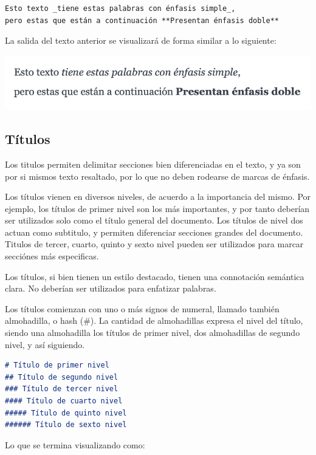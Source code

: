 \begin{lstlisting}[language=Markdown]
Esto texto _tiene estas palabras con énfasis simple_,
pero estas que están a continuación **Presentan énfasis doble**
\end{lstlisting}

La salida del texto anterior se visualizará de forma similar
a lo siguiente:

\includegraphics[]{apendices/markdown/imagenes/md_enfasis.png}

\subsection*{Títulos}

Los titulos permiten delimitar secciones bien diferenciadas en el texto,
y ya son por si mismos texto resaltado, por lo que no deben rodearse de
marcas de énfasis.

Los títulos vienen en diversos niveles, de acuerdo a la importancia del
mismo. Por ejemplo, los títulos de primer nivel son los más importantes,
y por tanto deberían ser utilizados solo como el título general del documento.
Los títulos de nivel dos actuan como subtitulo, y permiten diferenciar
secciones grandes del documento. Titulos de tercer, cuarto, quinto y sexto
nivel pueden ser utilizados para marcar secciónes más especificas.

Los títulos, si bien tienen un estilo destacado, tienen una connotación
semántica clara. No deberían ser utilizados para enfatizar palabras.

Los títulos comienzan con uno o más signos de numeral, llamado también
almohadilla, o hash (\#). La cantidad de almohadillas expresa el nivel
del título, siendo una almohadilla los títulos de primer nivel, dos almohadillas
de segundo nivel, y así siguiendo.

\begin{lstlisting}[language=Markdown]
# Título de primer nivel
## Título de segundo nivel
### Título de tercer nivel
#### Título de cuarto nivel
##### Título de quinto nivel
###### Título de sexto nivel
\end{lstlisting}

Lo que se termina visualizando como:

